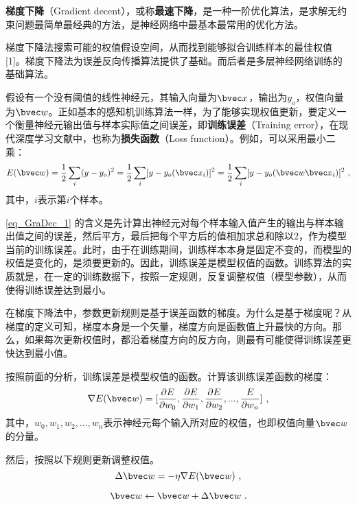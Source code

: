 
\textbf{梯度下降}（Gradient decent），或称\textbf{最速下降}，是一种一阶优化算法，是求解无约束问题最简单最经典的方法，是神经网络中最基本最常用的优化方法。

梯度下降法搜索可能的权值假设空间，从而找到能够拟合训练样本的最佳权值 [1]。梯度下降法为误差反向传播算法提供了基础。而后者是多层神经网络训练的基础算法。

假设有一个没有阈值的线性神经元，其输入向量为$\bvec x$，输出为$y_o$，权值向量为$\bvec w$。正如基本的感知机训练算法一样，为了能够实现权值更新，要定义一个衡量神经元输出值与样本实际值之间误差，即\textbf{训练误差}（Training error），在现代深度学习文献中，也称为\textbf{损失函数}（Loss function）。例如，可以采用最小二乘：
\begin{equation}\label{eq_GraDec_1}
E(\bvec w)=\frac{1}{2}\sum_i(y-y_o)^2=\frac{1}{2}\sum_i[y-y_o(\bvec x_i)]^2=\frac{1}{2}\sum_i[y-y_o(\bvec w \bvec x_i)]^2~,
\end{equation}
其中，$i$表示第$i$个样本。

\autoref{eq_GraDec_1} 的含义是先计算出神经元对每个样本输入值产生的输出与样本输出值之间的误差，然后平方，最后把每个平方后的值相加求总和除以$2$，作为模型当前的训练误差。此时，由于在训练期间，训练样本本身是固定不变的，而模型的权值是变化的，是须要更新的。因此，训练误差是模型权值的函数。训练算法的实质就是，在一定的训练数据下，按照一定规则，反复调整权值（模型参数），从而使得训练误差达到最小。

在梯度下降法中，参数更新规则是基于误差函数的梯度。为什么是基于梯度呢？从梯度的定义可知，梯度本身是一个矢量，梯度方向是函数值上升最快的方向。那么，如果每次更新权值时，都沿着梯度方向的反方向，则最有可能使得训练误差更快达到最小值。

按照前面的分析，训练误差是模型权值的函数。计算该训练误差函数的梯度：
\begin{equation}
\nabla E(\bvec w)=[\frac{\partial E}{\partial w_0},\frac{ \partial E}{\partial w_1},\frac{\partial E}{\partial w_2},...,\frac{E}{\partial w_n}]~,
\end{equation}
其中，$w_0,w_1,w_2, ..., w_n$表示神经元每个输入所对应的权值，也即权值向量$\bvec w$的分量。

然后，按照以下规则更新调整权值。
\begin{equation}\label{eq_GraDec_2}
\Delta \bvec w = - \eta \nabla E(\bvec w)~,
\end{equation}

\begin{equation}
\bvec w \leftarrow \bvec w + \Delta \bvec w~.
\end{equation}

